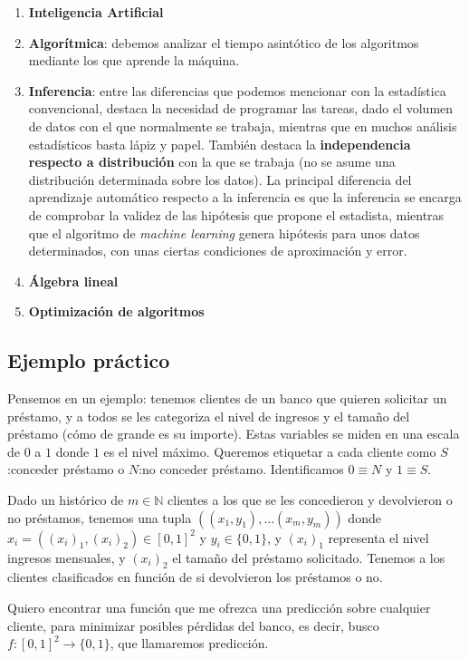 \begin{enumerate}[i]
 \item \textbf{Inteligencia Artificial}
 \item \textbf{Algorítmica}: debemos analizar el tiempo asintótico de los algoritmos mediante los que aprende la máquina.
 \item \textbf{Inferencia}: entre las diferencias que podemos mencionar con la estadística convencional, destaca la necesidad de 
 programar las tareas, dado el volumen de datos con el que normalmente se trabaja, mientras que en muchos análisis estadísticos basta 
 lápiz y papel. También destaca la \textbf{independencia respecto a distribución} con la que se trabaja (no se asume una distribución
 determinada sobre los datos). La principal diferencia del aprendizaje automático respecto a la inferencia es que la inferencia
 se encarga de comprobar la validez de las hipótesis que propone el estadista, mientras que el algoritmo de 
 \textit{machine learning} genera hipótesis para unos datos determinados, con unas ciertas condiciones de aproximación y error.
 \item \textbf{Álgebra lineal}
 \item \textbf{Optimización de algoritmos}
\end{enumerate}

\subsection{Ejemplo práctico}\label{sec:first-ex}
Pensemos en un ejemplo: tenemos clientes de un banco que quieren solicitar un préstamo, y a todos se les categoriza
el nivel de ingresos y el tamaño del préstamo (cómo de grande es su importe). Estas variables se miden 
en una escala de $0$ a $1$ donde $1$ es el nivel máximo. Queremos etiquetar a cada cliente como $S$:conceder préstamo o 
$N$:no conceder préstamo. Identificamos $0\equiv N$ y $1\equiv S$.

Dado un histórico de $m\in \mathbb{N}$ clientes a los que se les concedieron y devolvieron o no préstamos, tenemos una tupla 
$((x_1, y_1), \ldots (x_m, y_m))$ donde $x_i = ((x_i)_1, (x_i)_2) \in [0,1]^2$ y $y_i \in \{0,1\}$, y $(x_i)_1$ representa el nivel 
ingresos mensuales, y $(x_i)_2$ el tamaño del préstamo solicitado. Tenemos a los clientes clasificados en función de si 
devolvieron los préstamos o no.

Quiero encontrar una función que me ofrezca una predicción sobre cualquier cliente, para minimizar posibles pérdidas del banco, es
decir, busco $f:[0,1]^2 \rightarrow \{0,1\}$, que llamaremos predicción.

